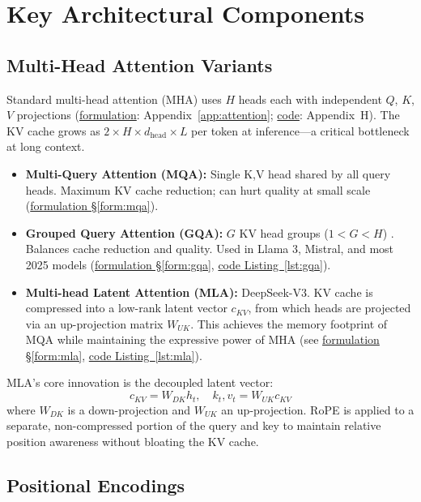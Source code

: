 \section{Key Architectural Components}

\subsection{Multi-Head Attention Variants}

Standard multi-head attention (MHA) uses $H$ heads each with independent $Q$, $K$, $V$ projections (\hyperref[form:sdpa]{formulation}: Appendix~\ref{app:attention}; \hyperref[lst:sdpa]{code}: Appendix~H). The KV cache grows as $2 \times H \times d_\text{head} \times L$ per token at inference---a critical bottleneck at long context.

\begin{itemize}
  \item \textbf{Multi-Query Attention (MQA):} Single K,V head shared by all query heads. Maximum KV cache reduction; can hurt quality at small scale (\hyperref[form:mqa]{formulation \S\ref*{form:mqa}}).
  \item \textbf{Grouped Query Attention (GQA):} $G$ KV head groups ($1 < G < H$) \parencite{ainslie2023gqa}. Balances cache reduction and quality. Used in Llama 3, Mistral, and most 2025 models (\hyperref[form:gqa]{formulation \S\ref*{form:gqa}}, \hyperref[lst:gqa]{code Listing~\ref*{lst:gqa}}).
  \item \textbf{Multi-head Latent Attention (MLA):} DeepSeek-V3. KV cache is compressed into a low-rank latent vector $c_{KV}$, from which heads are projected via an up-projection matrix $W_{UK}$. This achieves the memory footprint of MQA while maintaining the expressive power of MHA (see \hyperref[form:mla]{formulation \S\ref*{form:mla}}, \hyperref[lst:mla]{code Listing~\ref*{lst:mla}}).
\end{itemize}

\begin{keyinsight}
MLA's core innovation is the decoupled latent vector:
\[
c_{KV} = W_{DK} h_t, \quad k_t, v_t = W_{UK} c_{KV}
\]
where $W_{DK}$ is a down-projection and $W_{UK}$ an up-projection. RoPE is applied to a separate, non-compressed portion of the query and key to maintain relative position awareness without bloating the KV cache.
\end{keyinsight}

\subsection{Positional Encodings}

